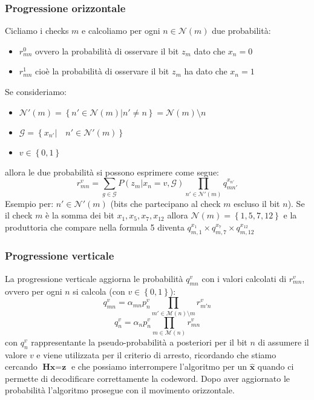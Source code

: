 \documentclass{article}
\begin{document}
	\subsubsection{Progressione orizzontale}
	Cicliamo i checks $m$ e calcoliamo per ogni $n \in \mathcal{N}(m)$ due probabilità:
	\begin{itemize}
		\item $r^0_{mn}$ ovvero la probabilità di osservare il bit $z_m$ dato che $x_n =0$
		\item $r^1_{mn}$ cioè la probabilità di osservare il bit $z_m$ ha dato che $x_n =1$
	\end{itemize}
	Se consideriamo:
	\begin{itemize}
		\item $\mathcal{N}'(m)=\left\{n' \in \mathcal{N}(m)| n' \neq n\right\} = \mathcal{N}(m) \setminus n$
		\item $\mathcal{G}=\left\{x_{n'} | \quad n' \in \mathcal{N}'(m) \right\}$ 
		\item $v \in \left\{0,1\right\}$
	\end{itemize}
	allora le due probabilità si possono esprimere come segue:
	\begin{equation}
		r^v_{mn}= \sum_{g \in \mathcal{G}} P(z_m|x_n = v, \mathcal{G}) \prod_{n' \in \mathcal{N}'(m)} q^{x_{n'}}_{mn'}
	\end{equation}
	Esempio per: $n' \in \mathcal{N}'(m)$ (bits che partecipano al check $m$ escluso il bit $n$). Se il check $m$ è la somma dei bit $x_1, x_5, x_7, x_{12}$ allora $\mathcal{N}(m) = \left\{ 1,5,7,12\right\}$ e la produttoria che compare nella formula 5 diventa $q_{m,1}^{x_1} \times q_{m, 7}^{x_7} \times q_{m,12}^{x_{12}}$  
	\subsubsection{Progressione verticale}
	La progressione verticale aggiorna le probabilità $q^v_{mn}$ con i valori calcolati di $r^v_{mn}$, ovvero per ogni $n$ si calcola (con $v \in \left\{0,1\right\}$):
	\begin{equation}
		q^v_{mn} = \alpha_{mn} p^v_n \prod_{m' \in \mathcal{M}(n)\setminus m} r^v_{m'n}
	\end{equation}
	\begin{equation}
		q^v_{n} = \alpha_{n} p^v_n \prod_{m \in \mathcal{M}(n)} r^v_{mn}
	\end{equation}
	con $q^v_{n}$ rappresentante la pseudo-probabilità a posteriori per il bit $n$ di assumere il valore $v$ e viene utilizzata per il criterio di arresto, ricordando che stiamo cercando $\textbf{Hx}=\textbf{z}$ e che possiamo interrompere l'algoritmo per un $\hat{\textbf{x}}$ quando ci permette di decodificare correttamente la codeword.
	Dopo aver aggiornato le probabilità l'algoritmo prosegue con il movimento orizzontale.
\end{document}

